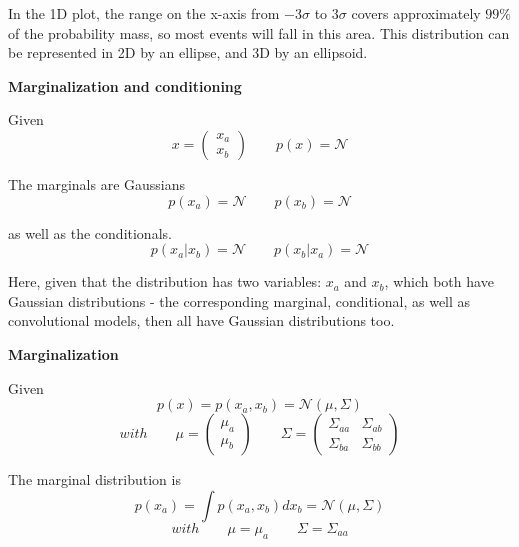 \documentclass[a4paper]{article}
\begin{document}
In the 1D plot, the range on the x-axis from $-3\sigma$ to $3\sigma$ covers approximately $99\%$ of the probability mass, so most events will fall in this area. This distribution can be represented in 2D by an ellipse, and 3D by an ellipsoid.

\textbf{Marginalization and conditioning}

Given
\begin{equation*}
    x = 
    \begin{pmatrix}
         x_a \\ x_b
    \end{pmatrix}
    \qquad
    p(x) = \mathcal{N}
\end{equation*}

The marginals are Gaussians
\begin{equation*}
    p(x_a) = \mathcal{N}
    \qquad
    p(x_b) = \mathcal{N}
\end{equation*}

as well as the conditionals.
\begin{equation*}
    p(x_a | x_b) = \mathcal{N}
    \qquad
    p(x_b | x_a) = \mathcal{N}
\end{equation*}

Here, given that the distribution has two variables: $x_a$ and $x_b$, which both have Gaussian distributions - the corresponding marginal, conditional, as well as convolutional models, then all have Gaussian distributions too.

\textbf{Marginalization}

Given 
\begin{equation*}
    p(x) = p(x_a, x_b) = \mathcal{N}(\mu, \Sigma)
\end{equation*}
\begin{equation*}
    with 
    \qquad
    \mu =
    \begin{pmatrix}
         \mu_a \\ \mu_b
    \end{pmatrix}
    \qquad
    \Sigma = 
    \begin{pmatrix}
         \Sigma_{aa} & \Sigma_{ab} 
         \\ \Sigma_{ba} & \Sigma_{bb}
    \end{pmatrix}
\end{equation*}

The marginal distribution is
\begin{equation*}
    p(x_a) = \int p(x_a, x_b) dx_b = \mathcal{N} (\mu, \Sigma)
\end{equation*}
\begin{equation*}
    with
    \qquad
    \mu = \mu_a
    \qquad
    \Sigma = \Sigma_{aa}
\end{equation*}
\end{document}
